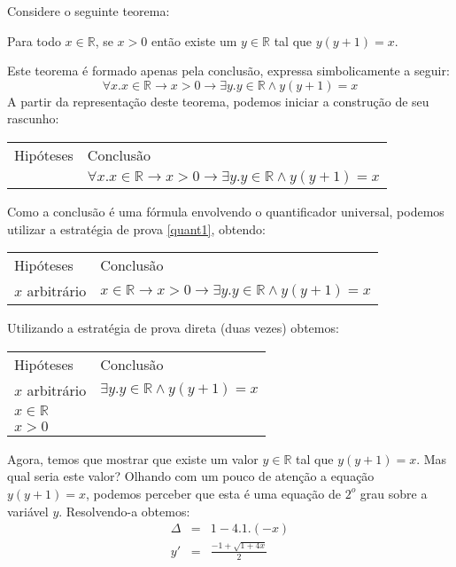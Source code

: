\begin{Example}
Considere o seguinte teorema:
\begin{flushleft}
   Para todo $x\in\mathbb{R}$, se $x > 0$ então existe um $y\in\mathbb{R}$ tal que
   $y(y + 1) = x$.
\end{flushleft}
Este teorema é formado apenas pela conclusão, expressa simbolicamente
a seguir:
\[
\forall x. x\in\mathbb{R} \to x > 0 \to \exists y . y\in\mathbb{R}
\land y (y + 1) = x
\]
A partir da representação deste teorema, podemos iniciar a construção
de seu rascunho:
\begin{flushleft}
\begin{tabular}{ll}
Hipóteses & Conclusão \\
 & $\forall x. x\in\mathbb{R} \to x > 0 \to \exists y . y\in\mathbb{R}
\land y (y + 1) = x$\\
\end{tabular}
\end{flushleft}
Como a conclusão é uma fórmula envolvendo o quantificador universal,
podemos utilizar a estratégia de prova \ref{quant1}, obtendo:
\begin{flushleft}
\begin{tabular}{ll}
Hipóteses & Conclusão \\
 $x$ arbitrário & $ x\in\mathbb{R} \to x > 0 \to \exists y . y\in\mathbb{R}
\land y (y + 1) = x$\\
\end{tabular}
\end{flushleft}
Utilizando a estratégia de prova direta (duas vezes) obtemos:
\begin{flushleft}
\begin{tabular}{ll}
Hipóteses & Conclusão \\
 $x$ arbitrário & $\exists y . y\in\mathbb{R}
\land y (y + 1) = x$\\
$x\in\mathbb{R}$ & \\
$x > 0$ & \\
\end{tabular}
\end{flushleft}
Agora, temos que mostrar que existe um valor $y \in\mathbb{R}$ tal que
$y(y+1) = x$. Mas qual seria este valor? Olhando com um pouco de
atenção a equação $y(y+1) = x$, podemos perceber que esta é uma
equação de $2^o$ grau sobre a variável $y$. Resolvendo-a obtemos:
\[
\begin{array}{lcl}
\Delta & = & 1 -4.1.(-x) \\
y' & = & \frac{-1 + \sqrt{1 + 4x}}{2}\\

\end{array}\]
\end{Example}
